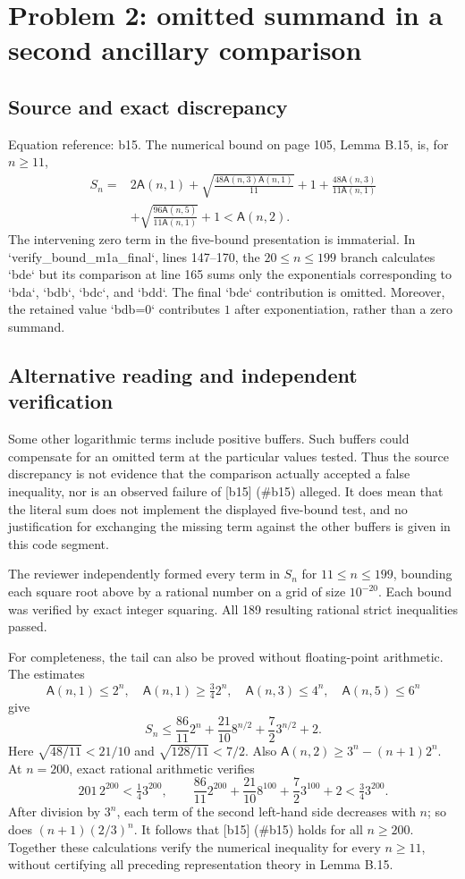 \documentclass[10pt]{article}
\begin{document}
\section*{Problem 2: omitted summand in a second ancillary comparison}
\subsection*{Source and exact discrepancy}
Equation reference: b15. The numerical bound on page 105, Lemma B.15, is, for \(n\geq11\), \[
 \begin{split}
 S_n={}&2\mathsf A(n,1)
 +\sqrt{\frac{48\mathsf A(n,3)\mathsf A(n,1)}{11}}+1
 +\frac{48\mathsf A(n,3)}{11\mathsf A(n,1)}\\
 &+\sqrt{\frac{96\mathsf A(n,5)}{11\mathsf A(n,1)}}+1
 <\mathsf A(n,2).
 \end{split}\] The intervening zero term in the five-bound presentation is immaterial. In `verify\_bound\_m1a\_final`, lines 147–170, the \(20\leq n\leq199\) branch calculates `bde` but its comparison at line 165 sums only the exponentials corresponding to `bda`, `bdb`, `bdc`, and `bdd`. The final `bde` contribution is omitted. Moreover, the retained value `bdb=0` contributes \(1\) after exponentiation, rather than a zero summand.\par
\subsection*{Alternative reading and independent verification}
Some other logarithmic terms include positive buffers. Such buffers could compensate for an omitted term at the particular values tested. Thus the source discrepancy is not evidence that the comparison actually accepted a false inequality, nor is an observed failure of [b15] (\#b15) alleged. It does mean that the literal sum does not implement the displayed five-bound test, and no justification for exchanging the missing term against the other buffers is given in this code segment.\par
The reviewer independently formed every term in \(S_n\) for \(11\leq n\leq199\), bounding each square root above by a rational number on a grid of size \(10^{-20}\). Each bound was verified by exact integer squaring. All 189 resulting rational strict inequalities passed.\par
For completeness, the tail can also be proved without floating-point arithmetic. The estimates \[\mathsf A(n,1)\leq2^n,\quad \mathsf A(n,1)\geq\tfrac34 2^n,\quad
 \mathsf A(n,3)\leq4^n,\quad \mathsf A(n,5)\leq6^n\] give \[S_n\leq \frac{86}{11}2^n+\frac{21}{10}8^{n/2}
                 +\frac72 3^{n/2}+2.\] Here \(\sqrt{48/11}<21/10\) and \(\sqrt{128/11}<7/2\). Also \(\mathsf A(n,2)\geq3^n-(n+1)2^n\). At \(n=200\), exact rational arithmetic verifies \[201\,2^{200}<\tfrac14 3^{200},\qquad
 \frac{86}{11}2^{200}+\frac{21}{10}8^{100}
       +\frac72 3^{100}+2<\tfrac34 3^{200}.\] After division by \(3^n\), each term of the second left-hand side decreases with \(n\); so does \((n+1)(2/3)^n\). It follows that [b15] (\#b15) holds for all \(n\geq200\). Together these calculations verify the numerical inequality for every \(n\geq11\), without certifying all preceding representation theory in Lemma B.15.\par
\end{document}
